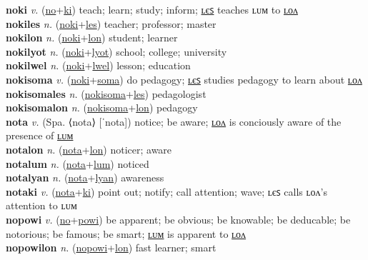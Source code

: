 \textbf{noki} \textit{v.} (\hyperref[no]{no}+\hyperref[ki]{ki})
teach; learn; study; inform; \hyperref[nokiles]{ʟєꜱ} teaches ʟᴜᴍ to \hyperref[nokilon]{ʟᴏᴧ} \label{noki} \\
\textbf{nokiles} \textit{n.} (\hyperref[noki]{noki}+\hyperref[les]{les})
teacher; professor; master \label{nokiles} \\
\textbf{nokilon} \textit{n.} (\hyperref[noki]{noki}+\hyperref[lon]{lon})
student; learner \label{nokilon} \\
\textbf{nokilyot} \textit{n.} (\hyperref[noki]{noki}+\hyperref[lyot]{lyot})
school; college; university \label{nokilyot} \\
\textbf{nokilwel} \textit{n.} (\hyperref[noki]{noki}+\hyperref[lwel]{lwel})
lesson; education \label{nokilwel} \\
\textbf{nokisoma} \textit{v.} (\hyperref[noki]{noki}+\hyperref[soma]{soma})
do pedagogy; \hyperref[nokisomales]{ʟєꜱ} studies pedagogy to learn about \hyperref[nokisomalon]{ʟᴏᴧ} \label{nokisoma} \\
\textbf{nokisomales} \textit{n.} (\hyperref[nokisoma]{nokisoma}+\hyperref[les]{les})
pedagologist \label{nokisomales} \\
\textbf{nokisomalon} \textit{n.} (\hyperref[nokisoma]{nokisoma}+\hyperref[lon]{lon})
pedagogy \label{nokisomalon} \\
\textbf{nota} \textit{v.} (Spa. ⟨nota⟩ [ˈnota])
notice; be aware; \hyperref[notalon]{ʟᴏᴧ} is conciously aware of the presence of \hyperref[notalum]{ʟᴜᴍ} \label{nota} \\
\textbf{notalon} \textit{n.} (\hyperref[nota]{nota}+\hyperref[lon]{lon})
noticer; aware \label{notalon} \\
\textbf{notalum} \textit{n.} (\hyperref[nota]{nota}+\hyperref[lum]{lum})
noticed \label{notalum} \\
\textbf{notalyan} \textit{n.} (\hyperref[nota]{nota}+\hyperref[lyan]{lyan})
awareness \label{notalyan} \\
\textbf{notaki} \textit{v.} (\hyperref[nota]{nota}+\hyperref[ki]{ki})
point out; notify; call attention; wave; ʟєꜱ calls ʟᴏᴧ's attention to ʟᴜᴍ \label{notaki} \\
\textbf{nopowi} \textit{v.} (\hyperref[no]{no}+\hyperref[powi]{powi})
be apparent; be obvious; be knowable; be deducable; be notorious; be famous; be smart; \hyperref[nopowilum]{ʟᴜᴍ} is apparent to \hyperref[nopowilon]{ʟᴏᴧ} \label{nopowi} \\
\textbf{nopowilon} \textit{n.} (\hyperref[nopowi]{nopowi}+\hyperref[lon]{lon})
fast learner; smart \label{nopowilon} \\
